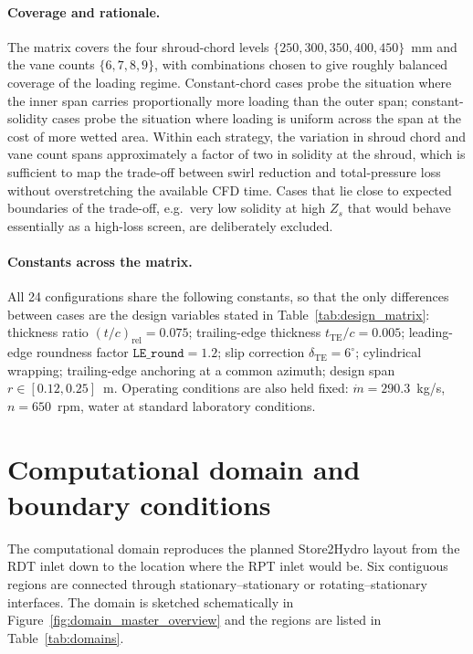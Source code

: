 \paragraph{Coverage and rationale.}
The matrix covers the four shroud-chord levels $\{250, 300, 350, 400, 450\}$~mm and the vane counts $\{6, 7, 8, 9\}$, with combinations chosen to give roughly balanced coverage of the loading regime. Constant-chord cases probe the situation where the inner span carries proportionally more loading than the outer span; constant-solidity cases probe the situation where loading is uniform across the span at the cost of more wetted area. Within each strategy, the variation in shroud chord and vane count spans approximately a factor of two in solidity at the shroud, which is sufficient to map the trade-off between swirl reduction and total-pressure loss without overstretching the available CFD time. Cases that lie close to expected boundaries of the trade-off, e.g.\ very low solidity at high $Z_s$ that would behave essentially as a high-loss screen, are deliberately excluded.
 
\paragraph{Constants across the matrix.}
All 24 configurations share the following constants, so that the only differences between cases are the design variables stated in Table~\ref{tab:design_matrix}: thickness ratio $(t/c)_{\mathrm{rel}} = 0.075$; trailing-edge thickness $t_{\mathrm{TE}}/c = 0.005$; leading-edge roundness factor $\texttt{LE\_round} = 1.2$; slip correction $\delta_{\mathrm{TE}} = 6^\circ$; cylindrical wrapping; trailing-edge anchoring at a common azimuth; design span $r \in [0.12, 0.25]$~m. Operating conditions are also held fixed: $\dot m = 290.3$~kg/s, $n = 650$~rpm, water at standard laboratory conditions.
 
\section{Computational domain and boundary conditions}
\label{sec:methods_domain}
 
The computational domain reproduces the planned Store2Hydro layout from the RDT inlet down to the location where the RPT inlet would be. Six contiguous regions are connected through stationary--stationary or rotating--stationary interfaces. The domain is sketched schematically in Figure~\ref{fig:domain_master_overview} and the regions are listed in Table~\ref{tab:domains}.
 
